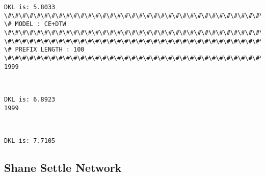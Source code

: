 \documentclass[11pt]{article}
\begin{document}
    \begin{Verbatim}[commandchars=\\\{\}]
DKL is: 5.8033
\#\#\#\#\#\#\#\#\#\#\#\#\#\#\#\#\#\#\#\#\#\#\#\#\#\#\#\#\#\#\#\#\#\#\#\#\#\#\#\#\#\#\#\#\#\#\#\#\#\#\#\#\#\#\#\#\#\#\#\#\#\#\#\#\#\#\#\#\#\#\#\#\#\#\#\#
\# MODEL : CE+DTW
\#\#\#\#\#\#\#\#\#\#\#\#\#\#\#\#\#\#\#\#\#\#\#\#\#\#\#\#\#\#\#\#\#\#\#\#\#\#\#\#\#\#\#\#\#\#\#\#\#\#\#\#\#\#\#\#\#\#\#\#\#\#\#\#\#\#\#\#\#\#\#\#\#\#\#\#
\#\#\#\#\#\#\#\#\#\#\#\#\#\#\#\#\#\#\#\#\#\#\#\#\#\#\#\#\#\#\#\#\#\#\#\#\#\#\#\#\#\#\#\#\#\#\#\#\#\#\#\#\#\#\#\#\#\#\#\#\#\#\#\#\#\#\#\#\#\#\#\#\#\#\#\#
\# PREFIX LENGTH : 100
\#\#\#\#\#\#\#\#\#\#\#\#\#\#\#\#\#\#\#\#\#\#\#\#\#\#\#\#\#\#\#\#\#\#\#\#\#\#\#\#\#\#\#\#\#\#\#\#\#\#\#\#\#\#\#\#\#\#\#\#\#\#\#\#\#\#\#\#\#\#\#\#\#\#\#\#
1999

    \end{Verbatim}

    \begin{center}
    \end{center}
    { \hspace*{\fill} \\}
    
    \begin{Verbatim}[commandchars=\\\{\}]
DKL is: 6.8923
1999

    \end{Verbatim}

    \begin{center}
    \end{center}
    { \hspace*{\fill} \\}
    
    \begin{Verbatim}[commandchars=\\\{\}]
DKL is: 7.7105

    \end{Verbatim}

    \subsection{Shane Settle Network}\label{shane-settle-network}
\end{document}
